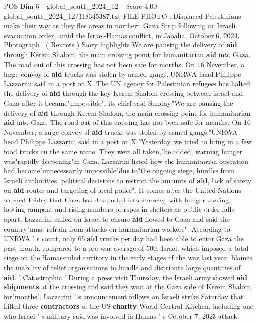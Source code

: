 \begin{textsample}{POS Dim 6 – global\_south\_2024\_12 – Score 4.00 – global\_south\_2024\_12/118345387.txt}  \label{ex:f6_pos_323}
FILE PHOTO : Displaced Palestinians make their way as they flee areas in northern Gaza Strip following an Israeli evacuation order, amid the Israel-Hamas conflict, in Jabalia, October 6, 2024.
Photograph : ( Reuters ) Story highlights We are pausing the delivery of \textbf{aid} through Kerem Shalom, the main crossing point for humanitarian \textbf{aid} into Gaza.
The road out of this crossing has not been safe for months.
On 16 November, a large convoy of \textbf{aid} trucks was stolen by armed gangs, UNRWA head Philippe Lazzarini said in a post on X.
The UN agency for Palestinian refugees has halted the delivery of \textbf{aid} through the key Kerem Shalom crossing between Israel and Gaza after it became"impossible", its chief said Sunday."We are pausing the delivery of \textbf{aid} through Kerem Shalom, the main crossing point for humanitarian \textbf{aid} into Gaza.
The road out of this crossing has not been safe for months.
On 16 November, a large convoy of \textbf{aid} trucks was stolen by armed gangs,"UNRWA head Philippe Lazzarini said in a post on X."Yesterday, we tried to bring in a few food trucks on the same route.
They were all taken,"he added, warning hunger was"rapidly deepening"in Gaza.
Lazzarini listed how the humanitarian operation had become"unnecessarily impossible"due to"the ongoing siege, hurdles from Israeli authorities, political decisions to restrict the amounts of \textbf{aid}, lack of safety on \textbf{aid} routes and targeting of local police".
It comes after the United Nations warned Friday that Gaza has descended into anarchy, with hunger soaring, looting rampant and rising numbers of rapes in shelters as public order falls apart.
Lazzarini called on Israel to ensure \textbf{aid} flowed to Gaza and said the country"must refrain from attacks on humanitarian workers".
According to UNRWA ' s count, only 65 \textbf{aid} trucks per day had been able to enter Gaza the past month, compared to a pre-war average of 500.
Israel, which imposed a total siege on the Hamas-ruled territory in the early stages of the war last year, blames the inability of relief organisations to handle and distribute large quantities of \textbf{aid}. ' Catastrophic ' During a press visit Thursday, the Israeli army showed \textbf{aid} \textbf{shipments} at the crossing and said they wait at the Gaza side of Kerem Shalom for"months".
Lazzarini ' s announcement follows an Israeli strike Saturday that killed three \textbf{contractors} of the US \textbf{charity} World Central Kitchen, including one who Israel ' s military said was involved in Hamas ' s October 7, 2023 attack.

\end{textsample}
